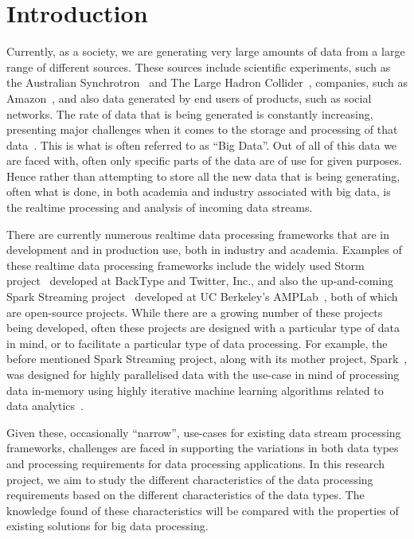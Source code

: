 \documentclass[a4paper,11pt]{article}
\begin{document}

\section{Introduction} %
\label{sec:introduction}

Currently, as a society, we are generating very large amounts of data from a large range of different sources. These
sources include scientific experiments, such as the Australian Synchrotron~\cite{web:synchrotron} and The Large Hadron
Collider~\cite{web:LHC}, companies, such as Amazon~\cite{web:Amazon}, and also data generated by end users of products,
such as social networks. The rate of data that is being generated is constantly increasing, presenting major challenges
when it comes to the storage and processing of that data~\cite{bohlouli_towards_2013}. This is what is often referred to
as ``Big Data''. Out of all of this data we are faced with, often only specific parts of the data are of use for given
purposes. Hence rather than attempting to store all the new data that is being generating, often what is done, in both
academia and industry associated with big data, is the realtime processing and analysis of incoming data streams.

There are currently numerous realtime data processing frameworks that are in development and in production use, both in
industry and academia. Examples of these realtime data processing frameworks include the widely used Storm
project~\cite{web:Storm} developed at BackType and Twitter, Inc., and also the up-and-coming Spark Streaming
project~\cite{web:SparkStreaming} developed at UC Berkeley's AMPLab~\cite{web:UCBerkelyAMCLab}, both of which are
open-source projects. While there are a growing number of these projects being developed, often these projects are
designed with a particular type of data in mind, or to facilitate a particular type of data processing. For example, the
before mentioned Spark Streaming project, along with its mother project, Spark~\cite{web:Spark}, was designed for highly parallelised
data with the use-case in mind of processing data in-memory using highly iterative machine learning algorithms related
to data analytics~\cite{liu_survey_2014}.

Given these, occasionally ``narrow'', use-cases for existing data stream processing frameworks, challenges are faced in
supporting the variations in both data types and processing requirements for data processing applications. In this
research project, we aim to study the different characteristics of the data processing requirements based on the
different characteristics of the data types. The knowledge found of these characteristics will be compared with the
properties of existing solutions for big data processing.
\end{document}
